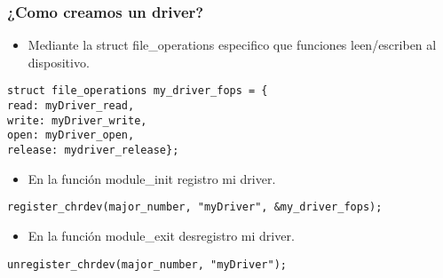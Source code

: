 \begin{frame}[fragile]
\frametitle{¿Como creamos un driver?}
  \begin{itemize}
  \item Mediante la struct \alert{file\_operations} especifico que funciones leen/escriben al dispositivo. 
  \end{itemize}
\begin{lstlisting}
struct file_operations my_driver_fops = {
read: myDriver_read,
write: myDriver_write,
open: myDriver_open,
release: mydriver_release};
\end{lstlisting}
\begin{itemize}
 \item En la función module\_init registro mi driver. 
\end{itemize}
\begin{lstlisting}
register_chrdev(major_number, "myDriver", &my_driver_fops);
\end{lstlisting}

\begin{itemize}
 \item En la función module\_exit desregistro mi driver. 
\end{itemize}
\begin{lstlisting}
unregister_chrdev(major_number, "myDriver");
\end{lstlisting}
\end{frame}

